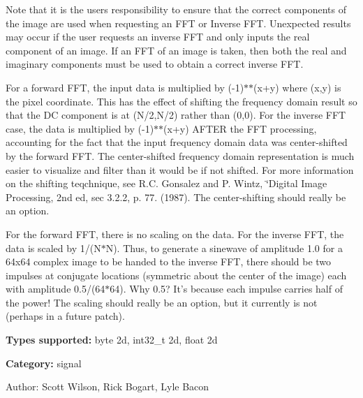 Note that it is the users responsibility to ensure that the correct components of the image are used when requesting an FFT or Inverse FFT. Unexpected results may occur if the user requests an inverse FFT and only inputs the real component of an image. If an FFT of an image is taken, then both the real and imaginary components must be used to obtain a correct inverse FFT.

For a forward FFT, the input data is multiplied by (-1)$\ast$$\ast$(x+y) where (x,y) is the pixel coordinate. This has the effect of shifting the frequency domain result so that the DC component is at (N/2,N/2) rather than (0,0). For the inverse FFT case, the data is multiplied by (-1)$\ast$$\ast$(x+y) AFTER the FFT processing, accounting for the fact that the input frequency domain data was center-shifted by the forward FFT. The center-shifted frequency domain representation is much easier to visualize and filter than it would be if not shifted. For more information on the shifting teqchnique, see R.C. Gonsalez and P. Wintz, \char`\"{}Digital Image Processing, 2nd ed, sec 3.2.2, p. 77. (1987). The center-shifting should really be an option.

For the forward FFT, there is no scaling on the data. For the inverse FFT, the data is scaled by 1/(N$\ast$N). Thus, to generate a sinewave of amplitude 1.0 for a 64x64 complex image to be handed to the inverse FFT, there should be two impulses at conjugate locations (symmetric about the center of the image) each with amplitude 0.5/(64$\ast$64). Why 0.5? It's because each impulse carries half of the power! The scaling should really be an option, but it currently is not (perhaps in a future patch).

{\bf Types supported:} byte 2d, int32\_\-t 2d, float 2d

{\bf Category:} signal

\begin{Desc}
\item[Author:]Scott Wilson, Rick Bogart, Lyle Bacon \end{Desc}
